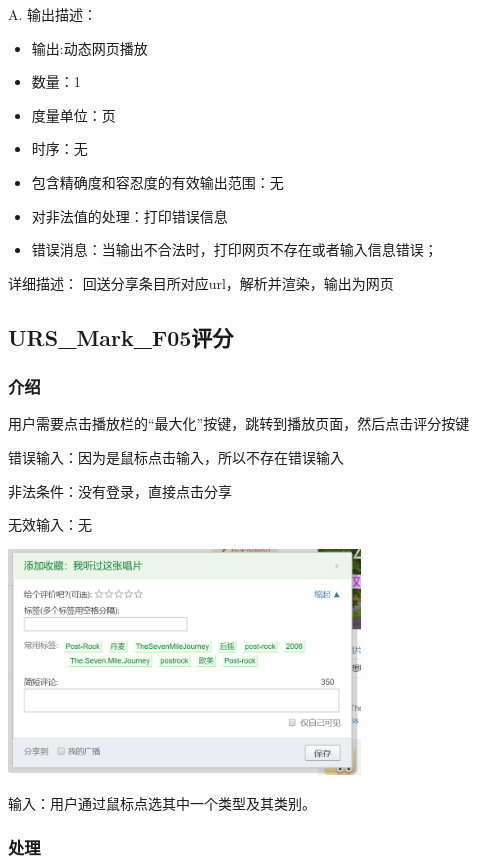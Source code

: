    A. 输出描述：
   \begin{itemize}
	\item	输出:动态网页播放
	\item	数量：1
	\item	度量单位：页
	\item	时序：无
	\item	包含精确度和容忍度的有效输出范围：无
	\item	对非法值的处理：打印错误信息
	\item	错误消息：当输出不合法时，打印网页不存在或者输入信息错误；
   \end{itemize}
   详细描述：
   回送分享条目所对应url，解析并渲染，输出为网页


   \subsection{URS\_Mark\_F05评分}

   \subsubsection{介绍}
   
   用户需要点击播放栏的“最大化”按键，跳转到播放页面，然后点击评分按键
   
   错误输入：因为是鼠标点击输入，所以不存在错误输入
   
   非法条件：没有登录，直接点击分享
   
   无效输入：无
   \begin{center} 
	\includegraphics[width=0.7\textwidth]{./figures/capture8.png} 
	\end{center}
   
   输入：用户通过鼠标点选其中一个类型及其类别。
   
   
   \subsubsection{处理}
   
